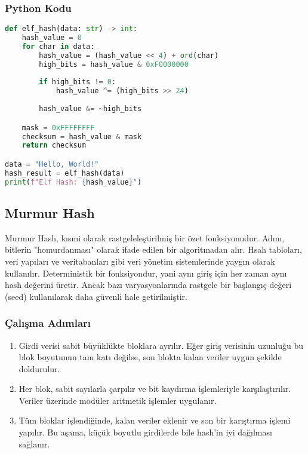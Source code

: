 \subsubsection{Python Kodu}

\begin{lstlisting}[language=Python]
def elf_hash(data: str) -> int:
    hash_value = 0
    for char in data:
        hash_value = (hash_value << 4) + ord(char)
        high_bits = hash_value & 0xF0000000
        
        if high_bits != 0:
            hash_value ^= (high_bits >> 24)
        
        hash_value &= ~high_bits

    mask = 0xFFFFFFFF
    checksum = hash_value & mask
    return checksum

data = "Hello, World!"
hash_result = elf_hash(data)
print(f"Elf Hash: {hash_value}")
\end{lstlisting}

\newpage

\subsection{Murmur Hash}

Murmur Hash, kısmi olarak rastgeleleştirilmiş bir özet fonksiyonudur. Adını, bitlerin "homurdanması" olarak ifade edilen bir algoritmadan alır. Hsah tabloları, veri yapıları ve veritabanları gibi veri yönetim sistemlerinde yaygın olarak kullanılır. Deterministik bir fonksiyondur, yani aynı giriş için her zaman aynı hash değerini üretir. Ancak bazı varyasyonlarında rastgele bir başlangıç değeri (seed) kullanılarak daha güvenli hale getirilmiştir.

\subsubsection{Çalışma Adımları}

\begin{enumerate}
    \item Girdi verisi sabit büyüklükte bloklara ayrılır. Eğer giriş verisinin uzunluğu bu blok boyutunun tam katı değilse, son blokta kalan veriler uygun şekilde doldurulur.
    \item Her blok, sabit sayılarla çarpılır ve bit kaydırma işlemleriyle karşılaştırılır. Veriler üzerinde modüler aritmetik işlemler uygulanır.
    \item Tüm bloklar işlendiğinde, kalan veriler eklenir ve son bir karıştırma işlemi yapılır. Bu aşama, küçük boyutlu girdilerde bile hash'in iyi dağılması sağlanır.
\end{enumerate}

